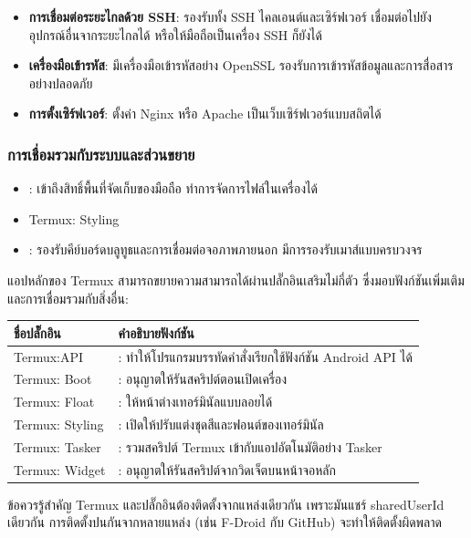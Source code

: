 \begin{itemize}
  \item \textbf{การเชื่อมต่อระยะไกลด้วย SSH}: รองรับทั้ง SSH ไคลเอนต์และเซิร์ฟเวอร์ เชื่อมต่อไปยังอุปกรณ์อื่นจากระยะไกลได้ หรือให้มือถือเป็นเครื่อง SSH ก็ยังได้
  \item \textbf{เครื่องมือเข้ารหัส}: มีเครื่องมือเข้ารหัสอย่าง OpenSSL รองรับการเข้ารหัสข้อมูลและการสื่อสารอย่างปลอดภัย
  \item \textbf{การตั้งเซิร์ฟเวอร์}: ตั้งค่า Nginx หรือ Apache เป็นเว็บเซิร์ฟเวอร์แบบสถิตได้
\end{itemize}

\subsubsection*{การเชื่อมรวมกับระบบและส่วนขยาย}

\begin{itemize}
  \item : เข้าถึงสิทธิ์พื้นที่จัดเก็บของมือถือ ทำการจัดการไฟล์ในเครื่องได้
  \item Termux: Styling
  \item : รองรับคีย์บอร์ดบลูทูธและการเชื่อมต่อจอภาพภายนอก มีการรองรับเมาส์แบบครบวงจร
\end{itemize}


แอปหลักของ Termux สามารถขยายความสามารถได้ผ่านปลั๊กอินเสริมไม่กี่ตัว ซึ่งมอบฟังก์ชันเพิ่มเติมและการเชื่อมรวมกับสิ่งอื่น:

\begin{center}
\begin{tabularx}{\linewidth}{|X|X|}
\hline
\textbf{ชื่อปลั๊กอิน} & \textbf{คำอธิบายฟังก์ชัน} \tabularnewline
\hline
Termux:API & : ทำให้โปรแกรมบรรทัดคำสั่งเรียกใช้ฟังก์ชัน Android API ได้ \tabularnewline
Termux: Boot & : อนุญาตให้รันสคริปต์ตอนเปิดเครื่อง \tabularnewline
Termux: Float & : ให้หน้าต่างเทอร์มินัลแบบลอยได้ \tabularnewline
Termux: Styling & : เปิดให้ปรับแต่งชุดสีและฟอนต์ของเทอร์มินัล \tabularnewline
Termux: Tasker & : รวมสคริปต์ Termux เข้ากับแอปอัตโนมัติอย่าง Tasker \tabularnewline
Termux: Widget & : อนุญาตให้รันสคริปต์จากวิดเจ็ตบนหน้าจอหลัก \tabularnewline
\hline
\end{tabularx}
\end{center}

\begin{tcbwarn}{ข้อควรรู้สำคัญ}
Termux และปลั๊กอินต้องติดตั้งจากแหล่งเดียวกัน เพราะมันแชร์ sharedUserId เดียวกัน การติดตั้งปนกันจากหลายแหล่ง (เช่น F-Droid กับ GitHub) จะทำให้ติดตั้งผิดพลาด

\end{tcbwarn}

